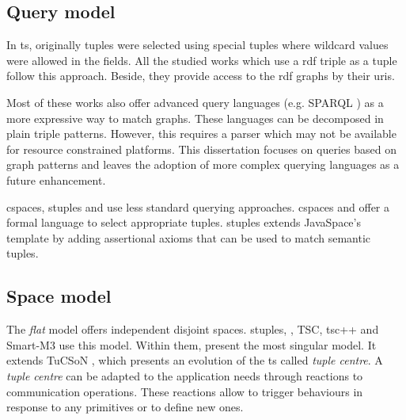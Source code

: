 


\subsection{Query model}

In \ac{ts}, originally tuples were selected using special tuples where wildcard values were allowed in the fields. %
All the studied works which use a \ac{rdf} triple as a tuple follow this approach.
Beside, they provide access to the \ac{rdf} graphs by their \acp{uri}.

Most of these works also offer advanced query languages (e.g. SPARQL ) as a more expressive way to match graphs.
These languages can be decomposed in plain triple patterns.
However, this requires a parser which may not be available for resource constrained platforms.
This dissertation focuses on queries based on graph patterns and leaves the adoption of more complex querying languages as a future enhancement.

\ac{cspaces}, \ac{stuples} and \citeauthor{nardini_semantic_2013} use less standard querying approaches.
\ac{cspaces} \citep{martinrecuerda_towards_2005} and \citet{nardini_semantic_2013} offer a formal language to select appropriate tuples.
\ac{stuples}\citep{khushraj_stuples:_2004} extends JavaSpace's template by adding assertional axioms that can be used to match semantic tuples.




\subsection{Space model}
\label{sec:soa_tsc_space}

The \emph{flat} model offers independent disjoint spaces.
\ac{stuples}, \citet{nardini_semantic_2013}, TSC, tsc++ and Smart-M3 use this model.
Within them, \citet{nardini_semantic_2013} present the most singular model.
It extends TuCSoN \cite{omicini_tucson:_1998}, which presents an evolution of the \ac{ts} called \emph{tuple centre}.
A \emph{tuple centre} can be adapted to the application needs through reactions to communication operations.
These reactions allow to trigger behaviours in response to any primitives or to define new ones.


